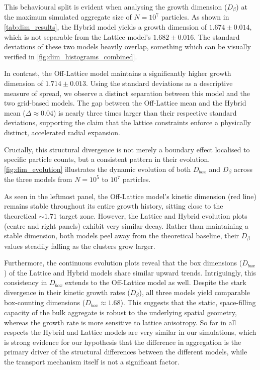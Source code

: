 \documentclass[12pt, a4paper, oneside]{report}
\theoremstyle{remark}
\begin{document}
This behavioural split is evident when analysing the growth dimension ($D_{\beta}$) at the maximum simulated aggregate size of $N=10^7$ particles. As shown in \cref{tab:dim_results}, the Hybrid model yields a growth dimension of $1.674 \pm 0.014$, which is not separable from the Lattice model's $1.682 \pm 0.016$. The standard deviations of these two models heavily overlap, something which can be visually verified in \cref{fig:dim_histograms_combined}.

In contrast, the Off-Lattice model maintains a significantly higher growth dimension of $1.714 \pm 0.013$. Using the standard deviations as a descriptive measure of spread, we observe a distinct separation between this model and the two grid-based models. The gap between the Off-Lattice mean and the Hybrid mean ($\Delta \approx 0.04$) is nearly three times larger than their respective standard deviations, supporting the claim that the lattice constraints enforce a physically distinct, accelerated radial expansion. 

Crucially, this structural divergence is not merely a boundary effect localised to specific particle counts, but a consistent pattern in their evolution. \cref{fig:dim_evolution} illustrates the dynamic evolution of both $D_{box}$ and $D_{\beta}$ across the three models from $N=10^5$ to $10^7$ particles. 

As seen in the leftmost panel, the Off-Lattice model's kinetic dimension (red line) remains stable throughout its entire growth history, sitting close to the theoretical $\sim 1.71$ target zone. However, the Lattice and Hybrid evolution plots (centre and right panels) exhibit very similar decay. Rather than maintaining a stable dimension, both models peel away from the theoretical baseline, their $D_{\beta}$ values steadily falling as the clusters grow larger.

Furthermore, the continuous evolution plots reveal that the box dimensions ($D_{box}$) of the Lattice and Hybrid models share similar upward trends. Intriguingly, this consistency in $D_{box}$ extends to the Off-Lattice model as well. Despite the stark divergence in their kinetic growth rates ($D_\beta$), all three models yield comparable box-counting dimensions ($D_{box} \approx 1.68$). This suggests that the static, space-filling capacity of the bulk aggregate is robust to the underlying spatial geometry, whereas the growth rate is more sensitive to lattice anisotropy. So far in all respects the Hybrid and Lattice models are very similar in our simulations, which is strong evidence for our hypothesis that the difference in aggregation is the primary driver of the structural differences between the different models, while the transport mechanism itself is not a significant factor.
\end{document}
